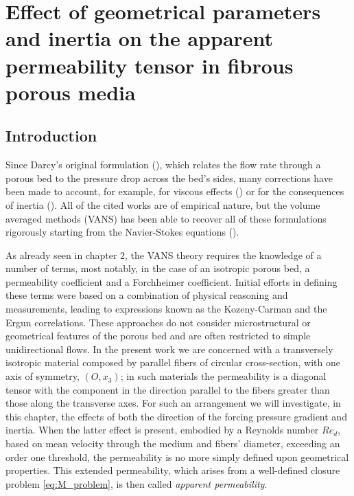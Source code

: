 \chapter{Effect of geometrical parameters and inertia on the apparent permeability tensor in fibrous porous media}
\label{ch:4}




\section{Introduction}

Since Darcy's original formulation (\citet{darcy}), which relates the flow rate through a porous bed to the pressure drop across the bed's sides, many corrections have been made to account, for example, for viscous effects (\citet{brinkman}) or for the consequences of inertia (\citet{forchheimer}).  
All of the cited works are of empirical nature, but the volume averaged methods (VANS) has been able to recover all of these
formulations rigorously starting from the Navier-Stokes equations (\citet{whitaker2013method}).

As already seen in chapter 2, the VANS theory requires the knowledge of a number of terms, most notably, in the case of an isotropic porous bed, a permeability coefficient and a Forchheimer coefficient. Initial efforts in defining these terms were based on a combination of physical reasoning and measurements, leading to  expressions known as the Kozeny-Carman \citet{kozeny, carman} and the Ergun \citet{ergun} correlations. These approaches do not consider microstructural or geometrical features of the porous bed and are often restricted to simple unidirectional flows. In the present work we are concerned with a transversely isotropic material composed by parallel fibers of circular cross-section, with one axis of symmetry, $(O,x_3)$; in such materials the permeability is a diagonal tensor
with the component in the direction parallel to the fibers greater than those along the transverse axes. For such an arrangement
we will investigate, in this chapter, the effects of both the direction of the forcing pressure gradient and inertia. When the latter effect is present,
embodied by a Reynolds number $Re_d$, based on mean velocity through the medium and fibers' diameter, exceeding an order one threshold, 
the permeability is no more simply defined upon geometrical properties. This extended permeability, which arises from a well-defined closure problem \eqref{eq:M_problem}, is then called \emph{apparent permeability}.

